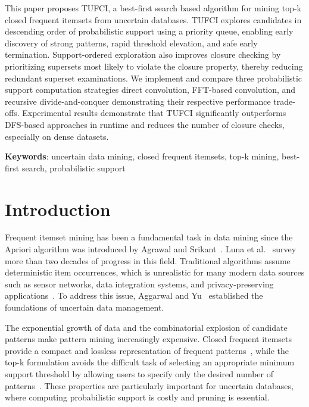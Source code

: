 \documentclass[10pt,letterpaper]{article}
\begin{document}
This paper proposes TUFCI, a best-first search based algorithm for mining
top-k closed frequent itemsets from uncertain databases. TUFCI explores
candidates in descending order of probabilistic support using a priority
queue, enabling early discovery of strong patterns, rapid threshold
elevation, and safe early termination. Support-ordered exploration also
improves closure checking by prioritizing supersets most likely to violate
the closure property, thereby reducing redundant superset examinations. We
implement and compare three probabilistic support computation strategies direct convolution, FFT-based convolution, and recursive divide-and-conquer demonstrating their respective performance trade-offs. Experimental results demonstrate that TUFCI significantly outperforms DFS-based approaches in runtime and reduces the number of closure checks, especially on dense datasets.

\textbf{Keywords}: uncertain data mining, closed frequent itemsets, top-k
mining, best-first search, probabilistic support

\linenumbers

\section*{Introduction}
Frequent itemset mining has been a fundamental task in data mining since the
Apriori algorithm was introduced by Agrawal and Srikant~\cite{bib1}. Luna
et al.~\cite{bib2} survey more than two decades of progress in this field.
Traditional algorithms assume deterministic item occurrences, which is
unrealistic for many modern data sources such as sensor networks, data
integration systems, and privacy-preserving applications~\cite{bib3}. To
address this issue, Aggarwal and Yu~\cite{bib4} established the foundations
of uncertain data management.

The exponential growth of data and the combinatorial explosion of candidate
patterns make pattern mining increasingly expensive. Closed frequent itemsets
provide a compact and lossless representation of frequent patterns~\cite{bib5},
while the top-k formulation avoids the difficult task of selecting an
appropriate minimum support threshold by allowing users to specify only the
desired number of patterns~\cite{bib6}. These properties are particularly
important for uncertain databases, where computing probabilistic support is
costly and pruning is essential.
\end{document}
